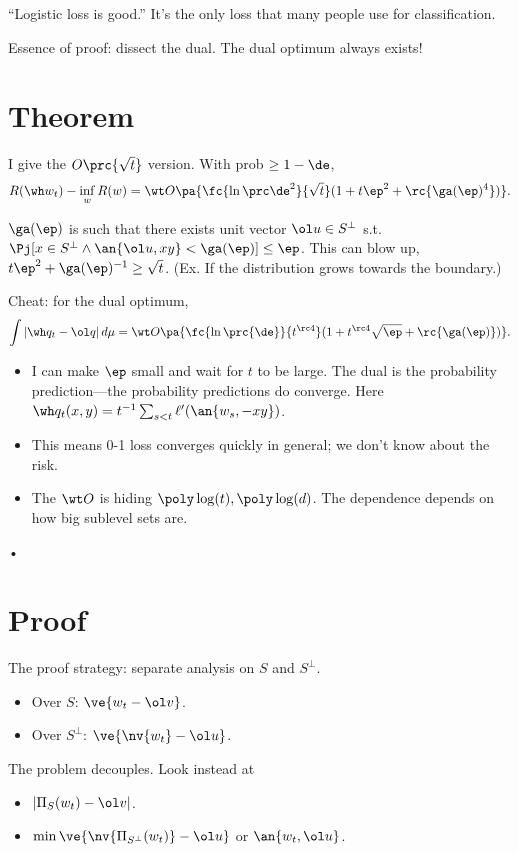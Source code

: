 ``Logistic loss is good.'' It's the only loss that many people use for classification.


Essence of proof: dissect %
the dual.
The dual optimum always exists! 

\section{Theorem}

I give the $O\prc{\sqrt t}$ version.  With prob $\ge 1-\de$,
$$
R(\wh w_t) - \inf_w R(w) = \wt O\pa{
\fc{\ln \prc\de^2}{\sqrt t}(1+t\ep^2 + \rc{\ga(\ep)^4})
}.
$$

$\ga(\ep)$ is such that there exists unit vector $\ol u\in S^{\perp}$ s.t. $\Pj[x\in S^\perp\wedge \an{\ol u, xy} < \ga(\ep)]\le \ep$. This can blow up, $t\ep^2 + \ga(\ep)^{-1}\ge \sqrt t$.
(Ex. If the distribution grows towards the boundary.)

Cheat: for the dual optimum,
$$
\int |\wh q_t - \ol q|\,d\mu = \wt O\pa{\fc{\ln \prc{\de}}{t^{\rc 4}}(1+t^{\rc 4}\sqrt \ep + \rc{\ga(\ep)})}.
$$

\begin{itemize}
\item
I can make $\ep$ small and wait for $t$ to be large. The dual is the probability prediction---the probability predictions do converge. 
Here $\wh q_t(x,y) = t^{-1} \sum_{s<t}\ell'(\an{w_s,-xy})$. 
\item
This means 0-1 loss converges quickly in general; we don't know about the risk.
\item
The $\wt O$ is hiding $\poly\log (t),\poly\log(d)$. The dependence depends on how big sublevel sets are. 
\end{itemize}•


\section{Proof}

The proof strategy: separate analysis on $S$ and $S^{\perp}$. 
\begin{itemize}
\item
Over $S$: $\ve{w_t - \ol v}$.
\item
Over $S^{\perp}$: $\ve{\nv{w_t} - \ol u}$.  %
\end{itemize}
The problem decouples. Look instead at
\begin{itemize}
\item
$|\Pi_S(w_t)-\ol v|$.
\item
$\min \ve{\nv{\Pi_{S^{\perp}} (w_t)} - \ol u}$ or $\an{w_t, \ol u}$.
\end{itemize}


